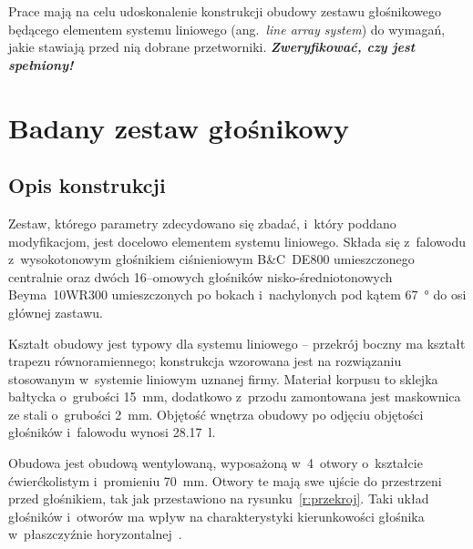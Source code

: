 \documentclass[12pt]{oska}
\newcommand{\comment}[1]{{\color{magenta}\emph{\textbf{#1}}}}
\begin{document}
		Prace mają na celu udoskonalenie konstrukcji obudowy zestawu głośnikowego będącego elementem systemu liniowego (ang.~\textit{line array system}) do wymagań, jakie stawiają przed nią dobrane przetworniki. \comment{Zweryfikować, czy jest spełniony!}
		

\section{Badany zestaw głośnikowy}

	\subsection{Opis konstrukcji}\label{ss:opis}
	
		Zestaw, którego parametry zdecydowano się zbadać, i~który poddano modyfikacjom, jest docelowo elementem systemu liniowego. Składa się z~falowodu z~wysokotonowym głośnikiem ciśnieniowym B\&C~DE800 umieszczonego centralnie oraz dwóch 16--omowych głośników nisko-średniotonowych Beyma~10WR300 umieszczonych po bokach i~nachylonych pod kątem \SI{67}{\degree} do osi głównej zastawu.
		
		Kształt obudowy jest typowy dla systemu liniowego -- przekrój boczny ma kształt trapezu równoramiennego; konstrukcja wzorowana jest na rozwiązaniu stosowanym w~systemie liniowym uznanej firmy. Materiał korpusu to sklejka bałtycka o~grubości \SI{15}{\milli\metre}, dodatkowo z~przodu zamontowana jest maskownica ze stali o~grubości \SI{2}{\milli\metre}. Objętość wnętrza obudowy po odjęciu objętości głośników i~falowodu wynosi \SI{28,17}{\litre}.
		
		Obudowa jest obudową wentylowaną, wyposażoną w~4~otwory o~kształcie ćwierćkolistym i~promieniu \SI{70}{\milli\metre}. Otwory te mają swe ujście do przestrzeni przed głośnikiem, tak jak przestawiono na rysunku~\ref{r:przekroj}. %
		Taki układ głośników i~otworów ma wpływ na charakterystyki kierunkowości głośnika w~płaszczyźnie horyzontalnej~\cite{kmiecik_inz}. %
		
\end{document}
